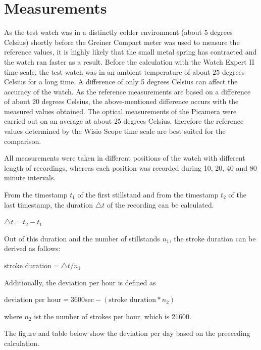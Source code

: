 \documentclass[12pt, a4paper]{report}
\begin{document}
    \section{Measurements}
As the test watch was in a distinctly colder environment (about 5 degrees Celsius) shortly before the Greiner Compact meter was used to measure the reference values, it is highly likely that the small metal spring has contracted and the watch ran faster as a result. Before the calculation with the Watch Expert II time scale, the test watch was in an ambient temperature of about 25 degrees Celsius for a long time. A difference of only 5 degrees Celsius can affect the accuracy of the watch\cite[p. 21 - 23]{Witschi_basics}. As the reference measurements are based on a difference of about 20 degrees Celsius, the above-mentioned difference occurs with the measured values obtained.
The optical measurements of the Picamera were carried out on an average at about 25 degrees Celsius, therefore the reference values determined by the Wisio Scope time scale are best suited for the comparison.

    All measurements were taken in different positions of the watch with different length
    of recordings, whereas each position was recorded during 10, 20, 40 and 80 minute intervals.
\newline

From the timestamp $t_1$ of the first stillstand and from the timestamp $t_2$ of the last timestamp, the duration $\triangle t$ of the recording can be calculated.
    \bigskip
    \begin{center}
    \(\triangle t = t_2-t_1\)
    \end{center}
     \bigskip
    
Out of this duration and the number of stillstands $n_1$, the stroke duration can be derived as follows:
    \bigskip
        \begin{center}
	\( \text{stroke duration} = \triangle t / n_1 \)
	    \end{center}
	\bigskip

Additionally, the deviation per hour is defined as 
  \bigskip
        \begin{center}
    \(\text{deviation per hour} = 3600\text{sec}-(\text{stroke duration}*n_2)\)
        
    \end{center}
        \bigskip
where $n_2$ ist the number of strokes per hour, which is 21600.

    The figure and table below show the deviation per day based on the preeceding calculation.
\end{document}
